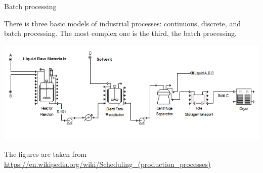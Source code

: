 \documentclass[10pt,dvipsnames]{beamer}
\begin{document}
\begin{frame}{Batch processing}

  There is three basic models of industrial processes: \alert{continuous}, \alert{discrete}, and \alert{batch processing}.  The most complex one is the third, the batch processing.

    \includegraphics[width=0.9\linewidth]{pics/BatchProcessPFD.png}


\noindent The figures are taken from \url{https://en.wikipedia.org/wiki/Scheduling_(production_processes)}

\end{frame}
\end{document}
